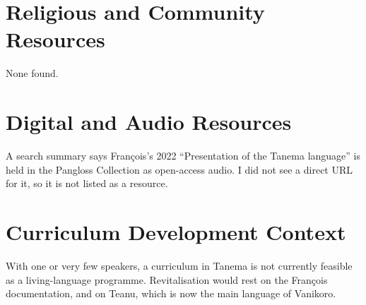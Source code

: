 \documentclass[12pt]{article}
\begin{document}
\section{Religious and Community Resources}
None found.

\section{Digital and Audio Resources}
A search summary says Fran\c{c}ois's 2022 ``Presentation of the Tanema language'' is held in the Pangloss Collection as open-access audio. I did not see a direct URL for it, so it is not listed as a resource.

\section{Curriculum Development Context}
With one or very few speakers, a curriculum in Tanema is not currently feasible as a living-language programme. Revitalisation would rest on the Fran\c{c}ois documentation, and on Teanu, which is now the main language of Vanikoro.
\end{document}
